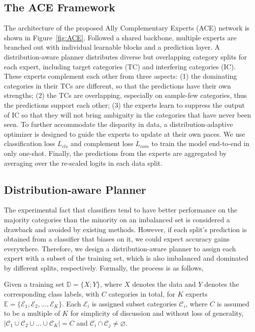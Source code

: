 \subsection{The ACE Framework}
The architecture of the proposed Ally Complementary Experts (ACE) network is shown in Figure~\ref{fig:ACE}. 
Followed a shared backbone, multiple experts are branched out with individual learnable blocks and a prediction layer. A distribution-aware planner distributes diverse but overlapping category splits for each expert, including target categories (TC) and interfering categories (IC). These experts complement each other from three aspects: (1) the dominating categories in their TCs are different, so that the predictions have their own strengths; (2) the TCs are overlapping, especially on sample-few categories, thus the predictions support each other; (3) the experts learn to suppress the output of IC so that they will not bring ambiguity in the categories that have never been seen. To further accommodate the disparity in data, a distribution-adaptive optimizer is designed to guide the experts to update at their own paces. We use classification loss $L_{cls}$ and complement loss $L_{com}$ to train the model end-to-end in only one-shot. Finally, the predictions from the experts are aggregated by averaging over the re-scaled logits in each data split.

\subsection{Distribution-aware Planner}
The experimental fact that classifiers tend to have better performance on the majority categories than the minority on an imbalanced set is considered a drawback and avoided by existing methods. However, if each split’s prediction is obtained from a classifier that biases on it, we could expect accuracy gains everywhere. Therefore, we design a distribution-aware planner to assign each expert with a subset of the training set, which is also imbalanced and dominated by different splits, respectively. Formally, the process is as follows,

Given a training set $\mathbb{D}=\{X;Y\}$, where $X$ denotes the data and $Y$ denotes the corresponding class labels, with $C$ categories in total, for $K$ experts $\mathbb{E}=\{\mathcal{E}_1, \mathcal{E}_2, ..., \mathcal{E}_K\}$. Each $\mathcal{E}_i$ is assigned subset categories $\mathcal{C}_i$, where $C$ is assumed to be a multiple of $K$ for simplicity of discussion and without loss of generality, $|\mathcal{C}_1 \cup \mathcal{C}_2 \cup ... \cup \mathcal{C}_K|=C$ and $\mathcal{C}_i \cap \mathcal{C}_j \neq \varnothing$. 

